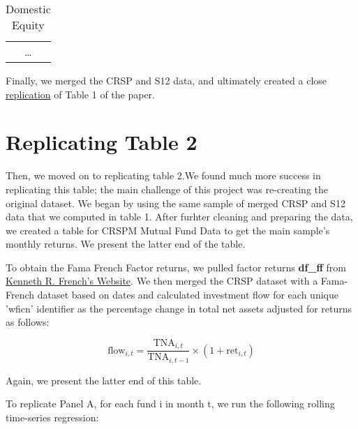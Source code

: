\documentclass{article}
\begin{document}
\begin{table}

\centering
\captionsetup{labelformat=empty, font=bf}
\caption{Domestic Equity}


\vspace{5pt} %

\begin{tabular}{c} %

\multicolumn{1}{c}{\ldots} \\ %
\end{tabular}

\end{table} 
 
Finally, we merged the CRSP and S12 data, and ultimately created
a close \hyperref[tab:table_complete]{replication} of Table 1 of the paper.


\section{Replicating Table 2}

Then, we moved on to replicating table 2.We found much more success in replicating this table; the main 
challenge of this project was re-creating the original dataset. We began by using the same sample of 
merged CRSP and S12 data that we computed in table 1. After furhter cleaning and preparing the data, 
we created a table for CRSPM Mutual Fund Data to get the main sample's monthly returns. We present 
the latter end of the table.   

% 

To obtain the Fama French Factor returns, we pulled factor returns \textbf{df\_ff} from 
\href{http://mba.tuck.dartmouth.edu/pages/faculty/ken.french/index.html}{Kenneth 
R. French's Website}. We then merged the CRSP dataset with a Fama-French dataset based on
dates and calculated investment flow for each unique 'wficn' identifier as the 
percentage change in total net assets adjusted for returns as follows: 

$$
\text{flow}_{i,t} = \frac{\text{TNA}_{i,t}}{\text{TNA}_{i,t-1}} \times (1 + \text{ret}_{i,t})
$$

Again, we present the latter end of this table. 

To replicate Panel A, for each fund i in month t, we run the following rolling time-series regression:
\end{document}
